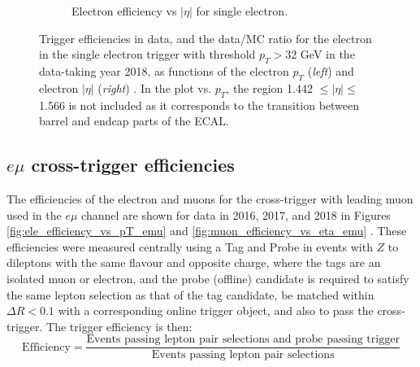 \begin{figure}[h]
\begin{subfigure}{0.45\textwidth}
        \caption{Electron efficiency vs $|\eta|$ for single electron.}
        \label{fig:single_ele_32GeV_efficiency_vs_eta}
    \end{subfigure}
    \caption[Trigger efficiencies in data and the data/MC ratio for the electron in the single electron trigger with threshold $p_{T} > 32$ GeV in the data-taking year 2018, as functions of the electron $p_{T}$ (\textit{left}) and electron $|\eta|$ (\textit{right}).]{Trigger efficiencies in data, and the data/MC ratio for the electron in the single electron trigger with threshold $p_{T} > 32$ GeV in the data-taking year 2018, as functions of the electron $p_{T}$ (\textit{left}) and electron $|\eta|$ (\textit{right}) \cite{CMS-DP-2020-016}. In the plot vs. $p_{T}$, the region 1.442 $\leq |\eta| \leq$ 1.566 is not included as it corresponds to the transition between barrel and endcap parts of the ECAL.} 
\end{figure}


\subsection{$e\mu$ cross-trigger efficiencies}

The efficiencies of the electron and muons for the cross-trigger with leading muon used in the $e\mu$ channel are shown for data in 2016, 2017, and 2018 in Figures \ref{fig:ele_efficiency_vs_pT_emu} and \ref{fig:muon_efficiency_vs_eta_emu} \cite{CMS-DP-2019-025}. These efficiencies were measured centrally using a Tag and Probe in events with $Z$ to dileptons with the same flavour and opposite charge, where the tags are an isolated muon or electron, and the probe (offline) candidate is required to satisfy the same lepton selection as that of the tag candidate, be matched within $\Delta R < 0.1$ with a corresponding online trigger object, and also to pass the cross-trigger. The trigger efficiency is then:
\begin{equation}
    \text{Efficiency} = \frac{\text{Events passing lepton pair selections and probe passing trigger}}{\text{Events passing lepton pair selections}}
\end{equation}

